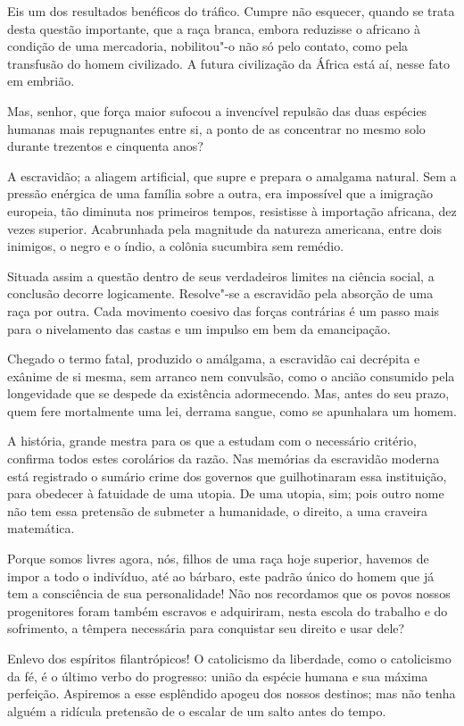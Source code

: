 Eis um dos resultados benéficos do tráfico. Cumpre não esquecer, quando
se trata desta questão importante, que a raça branca, embora reduzisse
o africano à condição de uma mercadoria, nobilitou"-o não só pelo
contato, como pela transfusão do homem civilizado. A futura civilização
da África está aí, nesse fato em embrião.

Mas, senhor, que força maior sufocou a invencível repulsão das duas
espécies humanas mais repugnantes entre si, a ponto de as concentrar no
mesmo solo durante trezentos e cinquenta anos? 

A escravidão; a aliagem artificial, que supre e prepara o amalgama
natural. Sem a pressão enérgica de uma família sobre a outra, era
impossível que a imigração europeia, tão diminuta nos primeiros tempos,
resistisse à importação africana, dez vezes superior. Acabrunhada pela
magnitude da natureza americana, entre dois inimigos, o negro e o
índio, a colônia sucumbira sem remédio.

Situada assim a questão dentro de seus verdadeiros limites na ciência
social, a conclusão decorre logicamente. Resolve"-se a escravidão pela
absorção de uma raça por outra. Cada movimento coesivo das forças
contrárias é um passo mais para o nivelamento das castas e um impulso
em bem da emancipação.

Chegado o termo fatal, produzido o amálgama, a escravidão cai decrépita
e exânime de si mesma, sem arranco nem convulsão, como o ancião
consumido pela longevidade que se despede da existência adormecendo.
Mas, antes do seu prazo, quem fere mortalmente uma lei, derrama sangue,
como se apunhalara um homem.

A história, grande mestra para os que a estudam com o necessário
critério, confirma todos estes corolários da razão. Nas memórias da
escravidão moderna está registrado o sumário crime dos governos que
guilhotinaram essa instituição, para obedecer à fatuidade de uma
utopia. De uma utopia, sim; pois outro nome não tem essa pretensão de
submeter a humanidade, o direito, a uma craveira matemática.

Porque somos livres agora, nós, filhos de uma raça hoje superior,
havemos de impor a todo o indivíduo, até ao bárbaro, este padrão único
do homem que já tem a consciência de sua personalidade! Não nos
recordamos que os povos nossos progenitores foram também escravos e
adquiriram, nesta escola do trabalho e do sofrimento, a têmpera
necessária para conquistar seu direito e usar dele?

Enlevo dos espíritos filantrópicos! O catolicismo da liberdade, como o
catolicismo da fé, é o último verbo do progresso: união da espécie
humana e sua máxima perfeição. Aspiremos a esse esplêndido apogeu dos
nossos destinos; mas não tenha alguém a ridícula pretensão de o escalar
de um salto antes do tempo. 

